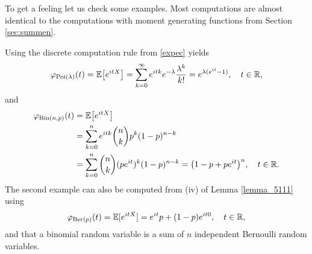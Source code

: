 	To get a feeling let us check some examples. Most computations are almost identical to the computations with moment generating functions from Section \ref{sec:summen}.
	\begin{example}
		Using the discrete computation rule from \eqref{expec} yields
		$$\varphi_{\text{Poi}(\lambda)}(t) = \mathbb{E} \big[ e^{itX} \big] = \sum_{k=0}^{\infty}  e^{itk}e^{-\lambda} \frac{\lambda^k}{k!} = e^{\lambda (e^{it}-1)},\quad t\in\mathbb{R},$$
		and
		\begin{align*}
			\varphi_{\text{Bin}(n,p)}(t)
			&=\mathbb{E}\big[ e^{itX} \big]\\
			&= \sum\limits_{k=0}^{n} e^{itk}{n\choose k} p^k (1-p)^{n-k}\\
			&= \sum\limits_{k=0}^{n}{n\choose k} (p  e^{it})^k (1-p)^{n-k} = \big( 1 - p +p  e^{it} \big)^n,\quad t\in\mathbb{R}.
		\end{align*}
		The second example can also be computed from (iv) of Lemma \ref{lemma_5111} using
		\begin{align*}
			\varphi_{\text{Ber}(p)}(t)=\mathbb{E}[e^{itX}]=e^{it}p+(1-p)e^{it0},\quad t\in\mathbb{R},
		\end{align*}
and that a binomial random variable is a sum of $n$ independent Bernoulli random variables.

		
	\end{example}
	
